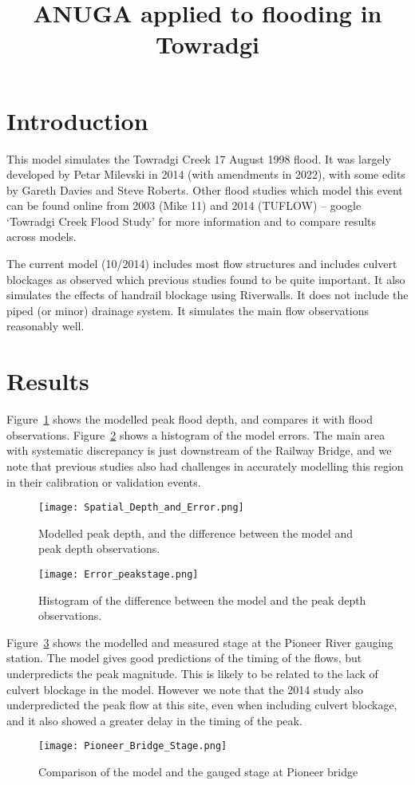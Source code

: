\documentclass{article}
\begin{document}
\title{ANUGA applied to flooding in Towradgi}

\maketitle

\section{Introduction}
This model simulates the Towradgi Creek 17 August 1998 flood. It was largely
developed by Petar Milevski in 2014 (with amendments in 2022), with some edits by Gareth 
Davies and Steve Roberts. Other flood studies which model this event can be found online 
from 2003 (Mike 11) and 2014 (TUFLOW) -- google `Towradgi Creek Flood Study' for
more information and to compare results across models. 

The current model (10/2014) includes most flow structures and includes culvert 
blockages as observed which previous studies found to be quite important. It also simulates
the effects of handrail blockage using Riverwalls. It does not include the piped (or minor) 
drainage system. It simulates the main flow observations reasonably well.

\section{Results}

Figure~\ref{fig:spatial} shows the modelled peak flood depth, and compares it with flood
observations. Figure~\ref{fig:hist} shows a histogram of the model errors. The main area
with systematic discrepancy is just downstream of the Railway Bridge, and we
note that previous studies also had challenges in accurately modelling this
region in their calibration or validation events. 

\begin{figure}
\center
\texttt{[image: Spatial\_Depth\_and\_Error.png]}
\caption{Modelled peak depth, and the difference between the model and peak depth observations.}
\label{fig:spatial}
\end{figure}

\begin{figure}
\center
\texttt{[image: Error\_peakstage.png]}
\caption{Histogram of the difference between the model and the peak depth observations.}
\label{fig:hist}
\end{figure}

Figure~\ref{fig:pioneer} shows the modelled and measured stage at the Pioneer
River gauging station. The model gives good predictions of the timing of the
flows, but underpredicts the peak magnitude. This is likely to be related to
the lack of culvert blockage in the model. However we note that the 2014 study
also underpredicted the peak flow at this site, even when including culvert
blockage, and it also showed a greater delay in the timing of the peak. 

\begin{figure}
\center
\texttt{[image: Pioneer\_Bridge\_Stage.png]}
\caption{Comparison of the model and the gauged stage at Pioneer bridge}
\label{fig:pioneer}
\end{figure}
\end{document}
